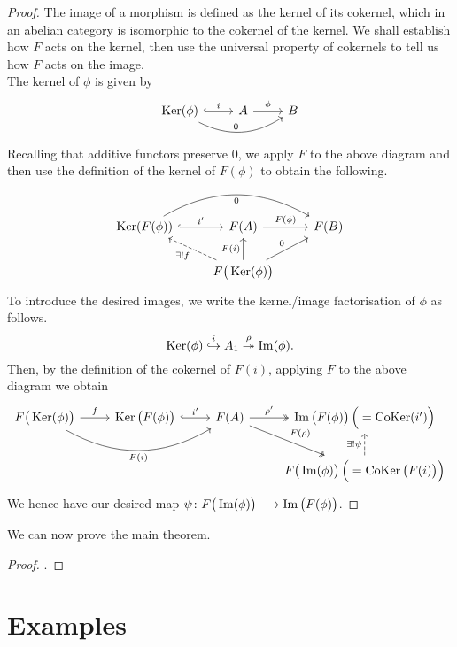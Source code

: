 \documentclass[a4paper]{article}
\def\into{\hookrightarrow}
\def\epi{\twoheadrightarrow}
\begin{document}
\begin{proof}
    The image of a morphism is defined as the kernel of its cokernel, which in an abelian category is isomorphic to the cokernel of the kernel. We shall establish how $F$ acts on the kernel, then use the universal property of cokernels to tell us how $F$ acts on the image.\\
    The kernel of $\phi$ is given by
    \[
        \begin{tikzcd}
            \Ker(\phi) \arrow[r, "i", hook] \arrow[rr, "0", bend right] & A \arrow[r, "\phi"] & B
        \end{tikzcd}
    \]
    Recalling that additive functors preserve $0$, we apply $F$ to the above diagram and then use the definition of the kernel of $F(\phi)$ to obtain the following.
    \[
        \begin{tikzcd}
            \Ker(F(\phi)) \arrow[r, "i'", hook] \arrow[rr, "0"', bend left] & F(A) \arrow[r, "F(\phi)"] & F(B) \\
                & F\big(\Ker(\phi)\big) \arrow[ul, "\exists ! f", dashed] \arrow[ur, "0"] \arrow[u, "F(i)"]&
        \end{tikzcd}
    \]
    To introduce the desired images, we write the kernel/image factorisation of $\phi$ as follows.
    \[
        \Ker(\phi) \stackrel{i}{\into} A_1 \stackrel{\rho}{\epi} \im(\phi).
    \]
    Then, by the definition of the cokernel of $F(i)$, applying $F$ to the above diagram we obtain
    \[
        \begin{tikzcd}
            F\big( \Ker(\phi) \big) \arrow[r, "f"] \arrow[rr, "F(i)"', bend right] & \Ker\big( F(\phi) \big) \arrow[r, "i'", hook] & F(A) \arrow[r, "\rho'", two heads] \arrow[rd, "F(\rho)", two heads] & \im\big(F(\phi)\big)\,  \Big(= \CoKer(i') \Big)\\
            & & & F\big(\im(\phi)\big)\, \Big( = \CoKer\big( F(i) \big)\Big) \arrow[u, "\exists! \psi", dashed]
        \end{tikzcd}
    \]
    We hence have our desired map $\psi\colon F\big(\operatorname{Im}(\phi)\big)\longrightarrow \operatorname{Im}\big(F(\phi)\big)$.
\end{proof}
We can now prove the main theorem.
\begin{proof}
    .
\end{proof}
\section{Examples}
\end{document}

